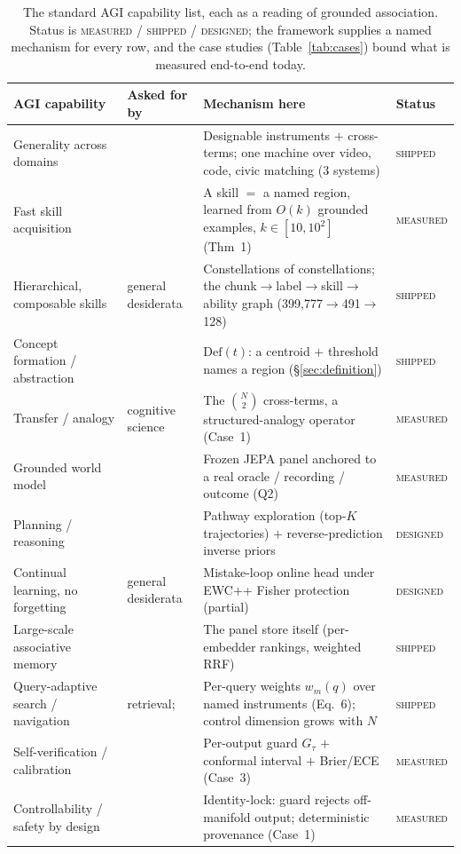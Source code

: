 \documentclass[10pt,twocolumn]{article}
\begin{document}
\begin{table}[t]
\centering
\caption{The standard AGI capability list, each as a reading of grounded
association. Status is \textsc{measured} / \textsc{shipped} / \textsc{designed};
the framework supplies a named mechanism for every row, and the case studies
(Table~\ref{tab:cases}) bound what is measured end-to-end today.}
\label{tab:caps}
\footnotesize
\setlength{\tabcolsep}{4pt}
\begin{tabular}{@{}p{2.7cm}p{2.7cm}p{7.4cm}p{1.5cm}@{}}
\toprule
\textbf{AGI capability} & \textbf{Asked for by} & \textbf{Mechanism here} & \textbf{Status}\\
\midrule
Generality across domains & \citet{morris2024levels} & Designable instruments $+$ cross-terms; one machine over video, code, civic matching (3 systems) & \textsc{shipped}\\
Fast skill acquisition & \citet{chollet2019measure} & A skill $=$ a named region, learned from $O(k)$ grounded examples, $k\!\in\![10,10^2]$ (Thm~1) & \textsc{measured}\\
Hierarchical, composable skills & general desiderata & Constellations of constellations; the chunk$\to$label$\to$skill$\to$ability graph (399{,}777$\to$491$\to$128) & \textsc{shipped}\\
Concept formation / abstraction & \citet{gardenfors2000conceptual} & $\mathrm{Def}(t)$: a centroid $+$ threshold names a region (\S\ref{sec:definition}) & \textsc{shipped}\\
Transfer / analogy & cognitive science & The $\binom{N}{2}$ cross-terms, a structured-analogy operator (Case~1) & \textsc{measured}\\
Grounded world model & \citet{lecun2022path} & Frozen JEPA panel anchored to a real oracle / recording / outcome (Q2) & \textsc{measured}\\
Planning / reasoning & \citet{lecun2022path} & Pathway exploration (top-$K$ trajectories) $+$ reverse-prediction inverse priors & \textsc{designed}\\
Continual learning, no forgetting & general desiderata & Mistake-loop online head under EWC++ Fisher protection (partial) & \textsc{designed}\\
Large-scale associative memory & \citet{lecun2022path} & The panel store itself (per-embedder rankings, weighted RRF) & \textsc{shipped}\\
Query-adaptive search / navigation & retrieval; \citet{gardenfors2014geometry} & Per-query weights $w_m(q)$ over named instruments (Eq.~6); control dimension grows with $N$ & \textsc{shipped}\\
Self-verification / calibration & \citet{morris2024levels} & Per-output guard $G_\tau$ $+$ conformal interval $+$ Brier/ECE (Case~3) & \textsc{measured}\\
Controllability / safety by design & \citet{lecun2022path} & Identity-lock: guard rejects off-manifold output; deterministic provenance (Case~1) & \textsc{measured}\\
\bottomrule
\end{tabular}
\end{table}
\end{document}
